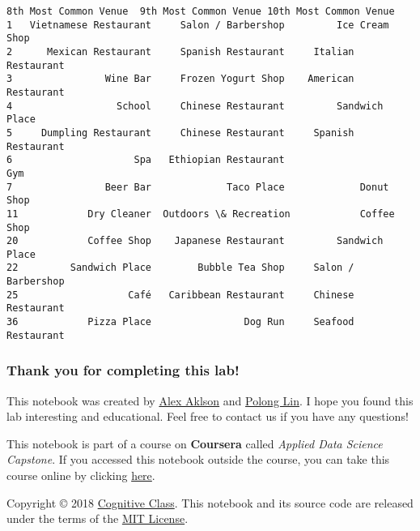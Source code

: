 \documentclass[11pt]{article}
\begin{document}
\begin{tcolorbox}[breakable, size=fbox, boxrule=.5pt, pad at break*=1mm, opacityfill=0]
\begin{Verbatim}[commandchars=\\\{\}]
    8th Most Common Venue  9th Most Common Venue 10th Most Common Venue
1   Vietnamese Restaurant     Salon / Barbershop         Ice Cream Shop
2      Mexican Restaurant     Spanish Restaurant     Italian Restaurant
3                Wine Bar     Frozen Yogurt Shop    American Restaurant
4                  School     Chinese Restaurant         Sandwich Place
5     Dumpling Restaurant     Chinese Restaurant     Spanish Restaurant
6                     Spa   Ethiopian Restaurant                    Gym
7                Beer Bar             Taco Place             Donut Shop
11            Dry Cleaner  Outdoors \& Recreation            Coffee Shop
20            Coffee Shop    Japanese Restaurant         Sandwich Place
22         Sandwich Place        Bubble Tea Shop     Salon / Barbershop
25                   Café   Caribbean Restaurant     Chinese Restaurant
36            Pizza Place                Dog Run     Seafood Restaurant
\end{Verbatim}
\end{tcolorbox}
        
    \hypertarget{thank-you-for-completing-this-lab}{%
\subsubsection{Thank you for completing this
lab!}\label{thank-you-for-completing-this-lab}}

This notebook was created by
\href{https://www.linkedin.com/in/aklson/}{Alex Aklson} and
\href{https://www.linkedin.com/in/polonglin/}{Polong Lin}. I hope you
found this lab interesting and educational. Feel free to contact us if
you have any questions!

    This notebook is part of a course on \textbf{Coursera} called
\emph{Applied Data Science Capstone}. If you accessed this notebook
outside the course, you can take this course online by clicking
\href{http://cocl.us/DP0701EN_Coursera_Week3_LAB2}{here}.

    Copyright © 2018
\href{https://cognitiveclass.ai/?utm_source=bducopyrightlink\&utm_medium=dswb\&utm_campaign=bdu}{Cognitive
Class}. This notebook and its source code are released under the terms
of the \href{https://bigdatauniversity.com/mit-license/}{MIT License}.


    
    
    
\end{document}
